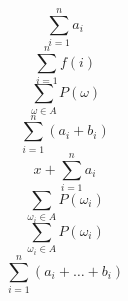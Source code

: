 \[
\sum_{i=1}^{n} a_i
\]
\[
\sum_{i=1}^{n} f(i)
\]
\[
\sum_{\omega\in A} P(\omega)
\]
\[
\sum_{i=1}^{n} (a_i+b_i)
\]
\[
x+\sum_{i=1}^{n} a_i
\]
\[
\sum_{\omega_i\in A}P(\omega_i)
\]
\[
\sum_{\omega_i \in A} P(\omega_i)
\]
\[
\sum_{i=1}^{n} (a_i+\dots+b_i)
\]
